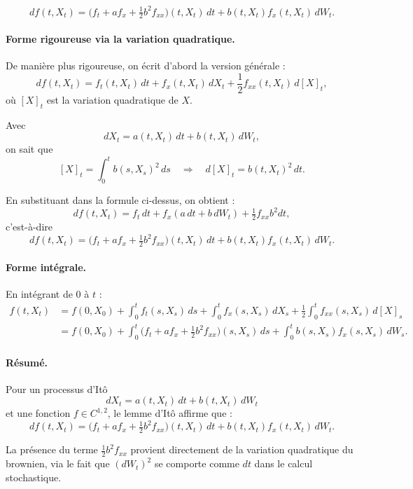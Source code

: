 \documentclass[11pt,a4paper]{article}
\newcommand{\1}{\mathbf{1}}
\begin{document}
\[
df(t,X_t)
= \bigl( f_t + a f_x + \tfrac12 b^2 f_{xx} \bigr)(t,X_t)\, dt
+ b(t,X_t) f_x(t,X_t)\, dW_t.
\]

\paragraph{Forme rigoureuse via la variation quadratique.}

De mani\`ere plus rigoureuse, on \'ecrit d'abord la version g\'en\'erale :
\[
df(t,X_t)
= f_t(t,X_t)\, dt
+ f_x(t,X_t)\, dX_t
+ \frac12 f_{xx}(t,X_t)\, d[X]_t,
\]
o\`u $[X]_t$ est la variation quadratique de $X$.

Avec
\[
dX_t = a(t,X_t)\,dt + b(t,X_t)\,dW_t,
\]
on sait que
\[
[X]_t = \int_0^t b(s,X_s)^2\, ds
\quad\Rightarrow\quad
d[X]_t = b(t,X_t)^2\, dt.
\]

En substituant dans la formule ci-dessus, on obtient :
\[
df(t,X_t)
= f_t\,dt + f_x(a\,dt + b\,dW_t) + \tfrac12 f_{xx} b^2 dt,
\]
c'est-\`a-dire
\[
df(t,X_t)
= \bigl( f_t + a f_x + \tfrac12 b^2 f_{xx} \bigr)(t,X_t)\, dt
+ b(t,X_t) f_x(t,X_t)\, dW_t.
\]

\paragraph{Forme int\'egrale.}

En int\'egrant de $0$ \`a $t$ :
\[
\begin{aligned}
f(t,X_t)
&= f(0,X_0)
+ \int_0^t f_t(s,X_s)\,ds
+ \int_0^t f_x(s,X_s)\,dX_s
+ \frac12 \int_0^t f_{xx}(s,X_s)\, d[X]_s \\
&= f(0,X_0)
+ \int_0^t \bigl(f_t + a f_x + \tfrac12 b^2 f_{xx}\bigr)(s,X_s)\,ds
+ \int_0^t b(s,X_s) f_x(s,X_s)\, dW_s.
\end{aligned}
\]

\paragraph{R\'esum\'e.}

Pour un processus d'It\^{o}
\[
dX_t = a(t,X_t)\,dt + b(t,X_t)\,dW_t
\]
et une fonction $f \in C^{1,2}$, le lemme d'It\^{o} affirme que :
\[
df(t,X_t)
= \bigl( f_t + a f_x + \tfrac12 b^2 f_{xx} \bigr)(t,X_t)\, dt
+ b(t,X_t) f_x(t,X_t)\, dW_t.
\]

La pr\'esence du terme $\tfrac12 b^2 f_{xx}$ provient directement de la
variation quadratique du brownien, via le fait que $(dW_t)^2$ se comporte
comme $dt$ dans le calcul stochastique.
\end{document}
